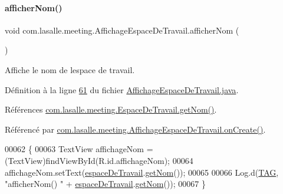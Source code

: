 \paragraph{\texorpdfstring{afficher\+Nom()}{afficherNom()}}
{\footnotesize\ttfamily void com.\+lasalle.\+meeting.\+Affichage\+Espace\+De\+Travail.\+afficher\+Nom (\begin{DoxyParamCaption}{ }\end{DoxyParamCaption})}



Affiche le nom de l\textquotesingle{}espace de travail. 



Définition à la ligne \hyperlink{_affichage_espace_de_travail_8java_source_l00061}{61} du fichier \hyperlink{_affichage_espace_de_travail_8java_source}{Affichage\+Espace\+De\+Travail.\+java}.



Références \hyperlink{_espace_de_travail_8java_source_l00087}{com.\+lasalle.\+meeting.\+Espace\+De\+Travail.\+get\+Nom()}.



Référencé par \hyperlink{_affichage_espace_de_travail_8java_source_l00041}{com.\+lasalle.\+meeting.\+Affichage\+Espace\+De\+Travail.\+on\+Create()}.


\begin{DoxyCode}
00062     \{
00063         TextView affichageNom = (TextView)findViewById(R.id.affichageNom);
00064         affichageNom.setText(\hyperlink{classcom_1_1lasalle_1_1meeting_1_1_affichage_espace_de_travail_a934d41c1c41882b94b65a95cee5aca13}{espaceDeTravail}.\hyperlink{classcom_1_1lasalle_1_1meeting_1_1_espace_de_travail_ae662e2674616a8548755cb64a38e0432}{getNom}());
00065 
00066         Log.d(\hyperlink{classcom_1_1lasalle_1_1meeting_1_1_affichage_espace_de_travail_a8606eb11c7b28f52226544de431d86a4}{TAG}, \textcolor{stringliteral}{"afficherNom() "} + \hyperlink{classcom_1_1lasalle_1_1meeting_1_1_affichage_espace_de_travail_a934d41c1c41882b94b65a95cee5aca13}{espaceDeTravail}.\hyperlink{classcom_1_1lasalle_1_1meeting_1_1_espace_de_travail_ae662e2674616a8548755cb64a38e0432}{getNom}());
00067     \}
\end{DoxyCode}
\mbox{\label{classcom_1_1lasalle_1_1meeting_1_1_affichage_espace_de_travail_ae8f1d5cb6d99aced1996b1b2bbcebe26}} 
